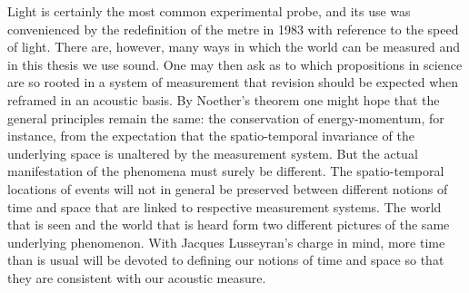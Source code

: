 Light is certainly the most common experimental probe,
and its use was convenienced by the redefinition of the metre in 1983 with reference to the speed of light\cite{CGPM1984}.
There are, however, many ways in which the world can be measured and in this thesis we use sound. 
One may then ask as to which propositions in science are so rooted in a system of measurement
that revision should be expected when reframed in an acoustic basis.
By Noether's theorem one might hope that the general principles remain the same:
the conservation of energy-momentum, for instance,
from the expectation that the spatio-temporal invariance of the underlying space is unaltered by the measurement system.
But the actual manifestation of the phenomena must surely be different.
The spatio-temporal locations of  events  will not in general be preserved between different notions of time and space that are linked to respective measurement systems.  
%
%  
The world that is seen and the world that is heard form two different pictures of the same underlying phenomenon.
%
With Jacques Lusseyran's charge in mind, more time than is usual will be devoted to defining our notions of time and space so that they are consistent with our acoustic measure.







